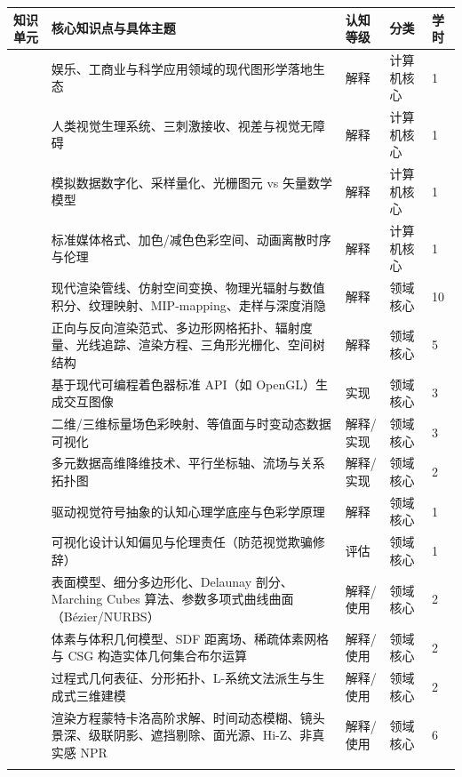 \noindent\begin{tabularx}{\textwidth}{p{} Y p{0.12\textwidth} p{0.10\textwidth} p{0.08\textwidth}}
\toprule
\textbf{知识单元} & \textbf{核心知识点与具体主题} & \textbf{认知等级} & \textbf{分类} & \textbf{学时} \\
\midrule
{} 
& 娱乐、工商业与科学应用领域的现代图形学落地生态 & 解释 & 计算机核心 & 1 \\
& 人类视觉生理系统、三刺激接收、视差与视觉无障碍 & 解释 & 计算机核心 & 1 \\
& 模拟数据数字化、采样量化、光栅图元 vs 矢量数学模型 & 解释 & 计算机核心 & 1 \\
& 标准媒体格式、加色/减色色彩空间、动画离散时序与伦理 & 解释 & 计算机核心 & 1 \\
\midrule
{} 
& 现代渲染管线、仿射空间变换、物理光辐射与数值积分、纹理映射、MIP-mapping、走样与深度消隐 & 解释 & 领域核心 & 10 \\
& 正向与反向渲染范式、多边形网格拓扑、辐射度量、光线追踪、渲染方程、三角形光栅化、空间树结构 & 解释 & 领域核心 & 5 \\
& 基于现代可编程着色器标准 API（如 OpenGL）生成交互图像 & 实现 & 领域核心 & 3 \\
\midrule
{} 
& 二维/三维标量场色彩映射、等值面与时变动态数据可视化 & 解释/实现 & 领域核心 & 3 \\
& 多元数据高维降维技术、平行坐标轴、流场与关系拓扑图 & 解释/实现 & 领域核心 & 2 \\
& 驱动视觉符号抽象的认知心理学底座与色彩学原理 & 解释 & 领域核心 & 1 \\
& 可视化设计认知偏见与伦理责任（防范视觉欺骗修辞） & 评估 & 领域核心 & 1 \\
\midrule
{} 
& 表面模型、细分多边形化、Delaunay 剖分、Marching Cubes 算法、参数多项式曲线曲面（Bézier/NURBS） & 解释/使用 & 领域核心 & 2 \\
& 体素与体积几何模型、SDF 距离场、稀疏体素网格与 CSG 构造实体几何集合布尔运算 & 解释/使用 & 领域核心 & 2 \\
& 过程式几何表征、分形拓扑、L-系统文法派生与生成式三维建模 & 解释/使用 & 领域核心 & 2 \\
\midrule
{} 
& 渲染方程蒙特卡洛高阶求解、时间动态模糊、镜头景深、级联阴影、遮挡剔除、面光源、Hi-Z、非真实感 NPR & 解释/使用 & 领域核心 & 6 \\
\midrule
{} 

\end{tabularx}
